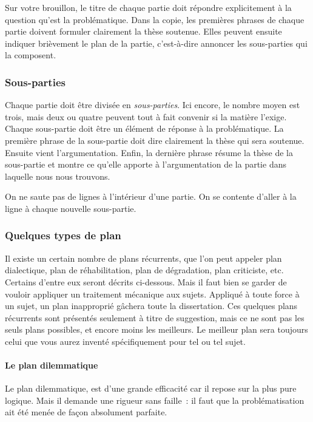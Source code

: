 \documentclass[a4paper,12pt]{article}
\begin{document}
Sur votre brouillon, le titre de chaque partie doit répondre
explicitement à la question qu'est la problématique. Dans la copie, les
premières phrases de chaque partie doivent formuler clairement la thèse
soutenue. Elles peuvent ensuite indiquer brièvement le plan de la
partie, c'est-à-dire annoncer les sous-parties qui la composent.

\subsubsection{Sous-parties}
\label{sec-3-1-3}

Chaque partie doit être divisée en \emph{sous-parties}. Ici encore, le nombre
moyen est trois, mais deux ou quatre peuvent tout à fait convenir si la
matière l'exige. Chaque sous-partie doit être un élément de réponse à la
problématique. La première phrase de la sous-partie doit dire clairement
la thèse qui sera soutenue. Ensuite vient l'argumentation. Enfin, la
dernière phrase résume la thèse de la sous-partie et montre ce qu'elle
apporte à l'argumentation de la partie dans laquelle nous nous trouvons.

On ne saute pas de lignes à l'intérieur d'une partie. On se contente
d'aller à la ligne à chaque nouvelle sous-partie.

\subsubsection{Quelques types de plan}
\label{sec-3-1-4}

Il existe un certain nombre de plans récurrents, que l'on peut appeler
plan dialectique, plan de réhabilitation, plan de dégradation, plan
criticiste, etc. Certains d'entre eux seront décrits ci-dessous. Mais il
faut bien se garder de vouloir appliquer un traitement mécanique aux
sujets. Appliqué à toute force à un sujet, un plan inapproprié gâchera
toute la dissertation. Ces quelques plans récurrents sont présentés
seulement à titre de suggestion, mais ce ne sont pas les seuls plans
possibles, et encore moins les meilleurs. Le meilleur plan sera toujours
celui que vous aurez inventé spécifiquement pour tel ou tel sujet.

\paragraph{Le plan dilemmatique}
\label{sec-3-1-4-1}

Le plan dilemmatique, est d'une grande efficacité car il repose sur la
plus pure logique. Mais il demande une rigueur sans faille : il faut que
la problématisation ait été menée de façon absolument parfaite.
\end{document}
